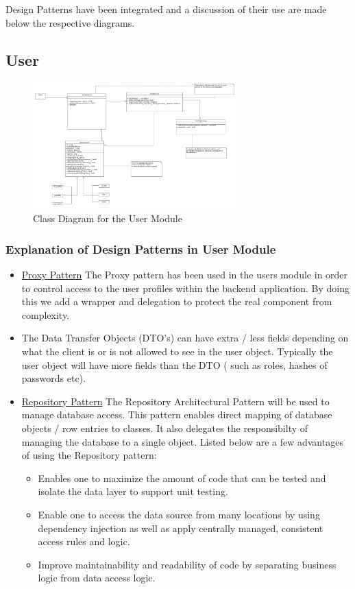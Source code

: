\documentclass[runningheads,a4paper]{article}
\begin{document}
Design Patterns have been integrated and a discussion of their use are made below the respective diagrams.

\subsection {User}

\begin{figure}[H]
   	\centering
   	\includegraphics[width=0.7\textwidth]{User_Class_Diagrams.png}
   	\caption{Class Diagram for the User Module}
\end{figure}
\subsubsection {Explanation of Design Patterns in User Module}
\begin{itemize}
\item \underline{Proxy Pattern} The Proxy pattern has been used in the users module in order to control access to the user profiles within the backend application. By doing this we add a wrapper and delegation to protect the real component from complexity. 

\item The Data Transfer Objects (DTO's)  can have extra / less fields depending on what the client is or is not allowed to see in the user object. Typically the user object will have more fields than the DTO ( such as roles, hashes of passwords etc). 

\item \underline{Repository Pattern} The Repository Architectural Pattern will be used to manage database access. This pattern enables direct mapping of database objects / row entries to classes. It also delegates the responsibilty of managing the database to a single object. Listed below are a few advantages of using the Repository pattern:
	\begin{itemize}
		\item Enables one to maximize the amount of code that can be tested and isolate the data layer to support unit testing. 
		\item Enable one to access the data source from many locations by using dependency injection as well as apply centrally managed, consistent access rules and logic.
		\item Improve maintainability and readability of code by separating business logic from data access logic.  
	\end{itemize} 
\end{itemize}
\end{document}
